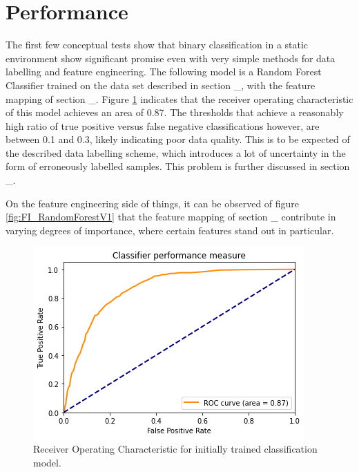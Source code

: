 \section{Performance} \label{sec:res_Performance}

The first few conceptual tests show that binary classification in a static environment show significant promise even with very simple methods for data labelling and feature engineering. The following model is a Random Forest Classifier trained on the data set described in section \_, with the feature mapping of section \_. Figure \ref{fig:ROC_RandomForestV1} indicates that the receiver operating characteristic of this model achieves an area of 0.87. The thresholds that achieve a reasonably high ratio of true positive versus false negative classifications however, are between 0.1 and 0.3, likely indicating poor data quality. This is to be expected of the described data labelling scheme, which introduces a lot of uncertainty in the form of erroneously labelled samples. This problem is further discussed in section \_.

On the feature engineering side of things, it can be observed of figure \ref{fig:FI_RandomForestV1} that the feature mapping of section \_ contribute in varying degrees of importance, where certain features stand out in particular. 

\begin{figure}[h]
    \centering
    \includegraphics[width=\textwidth]{Images/Models/ROC_RandomForestV1.png}
    \caption{Receiver Operating Characteristic for initially trained classification model.}
    \label{fig:ROC_RandomForestV1}
\end{figure}

